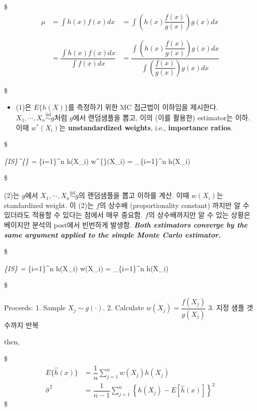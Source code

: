 \documentclass[
]{book}
\providecommand{\tightlist}{%
  \setlength{\itemsep}{0pt}\setlength{\parskip}{0pt}}
\begin{document}
\$
\begin{align*}



\mu &= \int h(x)f(x)dx &= \int \left( h(x) \dfrac {f(x)}{g(x)} \right)g(x)dx \tag{1} \\

\\
\\

&= \dfrac {\int h(x)f(x) dx}{\int f(x) dx} &= \dfrac {\int \left( h(x) \dfrac {f(x)}{g(x)} \right) g(x) dx}{\int \left( \dfrac {f(x)}{g(x)} \right) g(x) dx} \tag{2}

\end{align*}

\$

\begin{itemize}
\tightlist
\item
  (1)은 \(E \{ h(X) \}\)를 측정하기 위한 MC 접근법이 이하임을 제시한다. \(X_1 , \cdots, X_n \overset {\text{iid}}{\sim} g\)처럼 \(g\)에서 랜덤샘플을 뽑고, 이의 (이를 활용한) estimator는 이하. 이때 \(w^{\ast} (X_i)\)는 \textbf{unstandardized weights}, i.e., \textbf{importance ratios}.
\end{itemize}

\$

\hat \mu\emph{\{IS\}\^{}\{\ast\} =  \sum}\{i=1\}\^{}n h(X\_i) w\^{}\{\ast\}(X\_i) =  \sum\_\{i=1\}\^{}n h(X\_i) \ast {}

\$

(2)는 \(g\)에서 \(X_1 , \cdots, X_n \overset {\text{iid}}{\sim} g\)의 랜덤샘플을 뽑고 이하를 계산. 이때 \(w(X_i)\)는 standardized weight. 이 (2)는 \(f\)의 상수배 (proportionality constant) 까지만 알 수 있더라도 적용할 수 있다는 점에서 매우 중요함. \(f\)의 상수배까지만 알 수 있는 상황은 베이지안 분석의 post에서 빈번하게 발생함. \textbf{\emph{Both estimators converge by the same argument applied to the simple Monte Carlo estimator.}}

\$

\hat \mu\emph{\{IS\} = \sum}\{i=1\}\^{}n h(X\_i) w(X\_i) = \sum\_\{i=1\}\^{}n h(X\_i) 

\$

Proceeds:
1. Sample \(X_j \sim g(\cdot)\).
2. Calculate \(w(X_j) = \dfrac {f(X_j)}{g(X_j)}\)
3. 지정 샘플 갯수까지 반복

then,

\$
\begin{align*}

E\{\hat h(x)\} &= \dfrac {1}{n} \sum_{j=1}^n w(X_j)h(X_j) \\

\hat \sigma^2 &= \dfrac {1}{n-1}  \sum_{j=1}^n \left\{ h(X_j) - E\left[ \hat h(x) \right] \right\}^2

\end{align*}
\$
\end{document}
